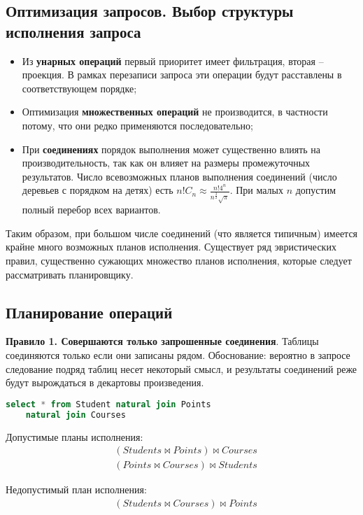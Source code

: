 \subsection{Оптимизация запросов. Выбор структуры исполнения запроса}

\begin{itemize}
	\item Из \textbf{унарных операций} первый приоритет имеет фильтрация, вторая -- проекция. В рамках перезаписи
	      запроса эти операции будут расставлены в соответствующем порядке;
	\item Оптимизация \textbf{множественных операций} не производится, в частности потому, что они редко применяются
	      последовательно;
	\item При \textbf{соединениях} порядок выполнения может существенно влиять на производительность, так
	      как он влияет на размеры промежуточных результатов. Число всевозможных планов выполнения соединений
	      (число деревьев с порядком на детях) есть $n! C_n \approx \frac{n! 4^n}{n^{\frac{3}{2}} \sqrt{\pi}}$. При малых $n$
	      допустим полный перебор всех вариантов.
\end{itemize}

Таким образом, при большом числе соединений (что является типичным) имеется крайне много возможных
планов исполнения. Существует ряд эвристических правил, существенно сужающих множество планов
исполнения, которые следует рассматривать планировщику.

\subsection{Планирование операций}

\textbf{Правило 1. Совершаются только запрошенные соединения}. Таблицы соединяются только если они
записаны рядом. Обоснование: вероятно в запросе следование подряд таблиц несет некоторый смысл, и
результаты соединений реже будут вырождаться в декартовы произведения.

\begin{example}
	\enewline
	\begin{lstlisting}[language=SQL]
    select * from Student natural join Points
    natural join Courses
    \end{lstlisting}

	Допустимые планы исполнения:
	\begin{align}
		 & (Students \bowtie Points) \bowtie Courses \\
		 & (Points \bowtie Courses) \bowtie Students
	\end{align}

	Недопустимый план исполнения:
	\begin{align}
		 & (Students \bowtie Courses) \bowtie Points
	\end{align}
\end{example}

